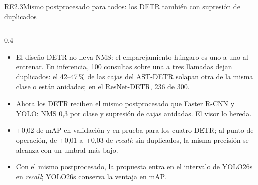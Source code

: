 \documentclass[aspectratio=169, 9pt]{beamer}
\begin{document}
\begin{frame}{RE2.3}{Mismo postprocesado para todos: los DETR también con supresión de duplicados}
\begin{columns}[T]
\begin{column}{0.4\textwidth}
            \small
            \begin{itemize}
                \item El diseño DETR no lleva NMS: el emparejamiento húngaro es uno a uno al
                      entrenar. En inferencia, 100 consultas sobre una a tres llamadas dejan
                      duplicados: el 42--47\,\% de las cajas del AST-DETR solapan otra de la
                      misma clase o están anidadas; en el ResNet-DETR, 236 de 300.
                \item Ahora los DETR reciben el mismo postprocesado que Faster R-CNN y YOLO:
                      NMS 0,3 por clase y supresión de cajas anidadas. El visor lo hereda.
                \item +0,02 de mAP en validación y en prueba para los cuatro DETR; al punto de
                      operación, de +0,01 a +0,03 de \textit{recall}: sin duplicados, la misma
                      precisión se alcanza con un umbral más bajo.
                \item Con el mismo postprocesado, la propuesta entra en el intervalo de YOLO26s
                      en \textit{recall}; YOLO26s conserva la ventaja en mAP.
            \end{itemize}
        \end{column}
    \end{columns}
\end{frame}
\end{document}
